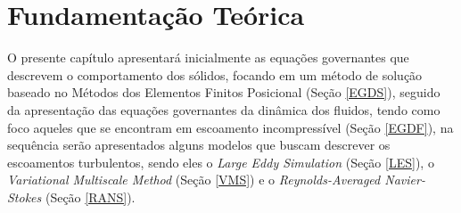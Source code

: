 \documentclass[_ArquivoPrincipal.tex]{subfiles}
\begin{document}
\chapter{Fundamentação Teórica} \label{FT}

O presente capítulo apresentará inicialmente as equações governantes que descrevem o comportamento dos sólidos, focando em um método de solução baseado no Métodos dos Elementos Finitos Posicional (Seção \ref{EGDS}), seguido da apresentação das equações governantes da dinâmica dos fluidos, tendo como foco aqueles que se encontram em escoamento incompressível (Seção \ref{EGDF}), na sequência serão apresentados alguns modelos que buscam descrever os escoamentos turbulentos, sendo eles o \textit{Large Eddy Simulation} (Seção \ref{LES}), o \textit{Variational Multiscale Method} (Seção \ref{VMS}) e o \textit{Reynolds-Averaged Navier-Stokes} (Seção \ref{RANS}).





\end{document}

